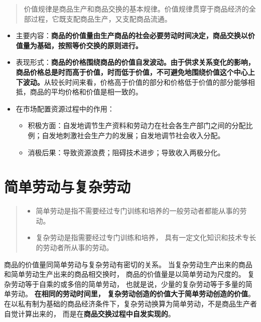 \documentclass[
]{article}
\begin{document}
\begin{quote}
价值规律是商品生产和商品交换的基本规律。价值规律贯穿于商品经济的全部过程，它既支配商品生产，又支配商品流通。
\end{quote}

\begin{itemize}
\item
  主要内容：\textbf{商品的价值量由生产商品的社会必要劳动时间决定，商品交换以价值量为基础，按照等价交换的原则进行。}
\item
  表现形式：\textbf{商品的价格围绕商品的价值自发波动。由于供求关系变化的影响，商品价格总是时而高于价值，时而低于价值，不可避免地围绕价值这个中心上下波动。}从较长时间来看，价格高于价值的部分和价格低于价值的部分能够相抵，商品的平均价格和价值是相一致的。
\item
  在市场配置资源过程中的作用：

  \begin{itemize}
  \item
    积极方面：自发地调节生产资料和劳动力在社会各生产部门之间的分配比例；自发地刺激社会生产力的发展；自发地调节社会收入分配。
  \item
    消极后果：导致资源浪费；阻碍技术进步；导致收入两极分化。
  \end{itemize}
\end{itemize}

\hypertarget{ux7b80ux5355ux52b3ux52a8ux4e0eux590dux6742ux52b3ux52a8}{%
\section{简单劳动与复杂劳动}\label{ux7b80ux5355ux52b3ux52a8ux4e0eux590dux6742ux52b3ux52a8}}

\begin{quote}
\begin{itemize}
\item
  简单劳动是指不需要经过专门训练和培养的一般劳动者都能从事的劳动。
\item
  复杂劳动是指需要经过专门训练和培养，
  具有一定文化知识和技术专长的劳动者所从事的劳动。
\end{itemize}
\end{quote}

商品的价值量同简单劳动与复杂劳动有密切的关系。
当复杂劳动生产出来的商品和简单劳动生产出来的商品相交换时，
商品的价值量是以简单劳动为尺度的。 复杂劳动等于自乘的或多倍的简单劳动，
也就是说，少量的复杂劳动等于多量的简单劳动。
\textbf{在相同的劳动时间里，
复杂劳动创造的价值大于简单劳动创造的价值}。在以私有制为基础的商品经济条件下，复杂劳动换算为简单劳动，不是商品生产者自觉计算出来的，
而是在\textbf{商品交换过程中自发实现的}。
\end{document}
